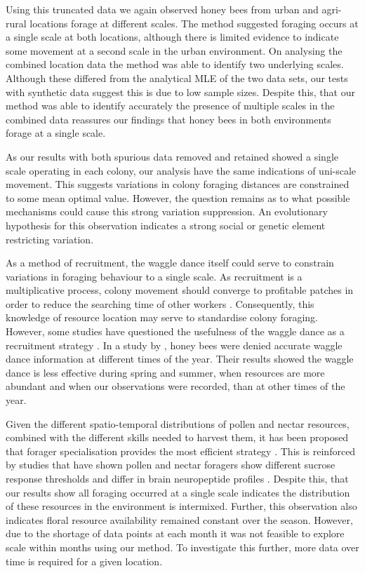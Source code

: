\documentclass[11pt,usenames,dvipsnames]{article}
\begin{document}
\begin{linenumbers}
Using this truncated data we again observed honey bees from urban and agri-rural locations forage at different scales. The method suggested foraging occurs at a single scale at both locations, although there is limited evidence to indicate some movement at a second scale in the urban environment. On analysing the combined location data the method was able to identify two underlying scales. Although these differed from the analytical MLE of the two data sets, our tests with synthetic data suggest this is due to low sample sizes. Despite this, that our method was able to identify accurately the presence of multiple scales in the combined data reassures our findings that honey bees in both environments forage at a single scale. 

As our results with both spurious data removed and retained showed a single scale operating in each colony, our analysis have the same indications of uni-scale movement. This suggests variations in colony foraging distances are constrained to some mean optimal value. However, the question remains as to what possible mechanisms could cause this strong variation suppression. An evolutionary hypothesis for this observation indicates a strong social or genetic element restricting variation.

As a method of recruitment, the waggle dance itself could serve to constrain variations in foraging behaviour to a single scale. As recruitment is a multiplicative process, colony movement should converge to profitable patches in order to reduce the searching time of other workers \citep{Seeley1995}. Consequently, this knowledge of resource location may serve to standardise colony foraging. However, some studies have questioned the usefulness of the waggle dance as a recruitment strategy \citep{Sherman2002, Dornhaus2004, Gruter2008, Gruter2009, Schurch2013}. In a study by \cite{Sherman2002}, honey bees were denied accurate waggle dance information at different times of the year. Their results showed the waggle dance is less effective during spring and summer, when resources are more abundant and when our observations were recorded, than at other times of the year.

Given the different spatio-temporal distributions of pollen and nectar resources, combined with the different skills needed to harvest them, it has been proposed that forager specialisation provides the most efficient strategy \citep{Duarte2012}. This is reinforced by studies that have shown pollen and nectar foragers show different sucrose response thresholds \citep{Pankiw2000} and differ in brain neuropeptide profiles \citep{Brockmann2009}. Despite this, that our results show all foraging occurred at a single scale indicates the distribution of these resources in the environment is intermixed. Further, this observation also indicates floral resource availability remained constant over the season. However, due to the shortage of data points at each month it was not feasible to explore scale within months using our method. To investigate this further, more data over time is required for a given location.


\end{linenumbers}
\end{document}
